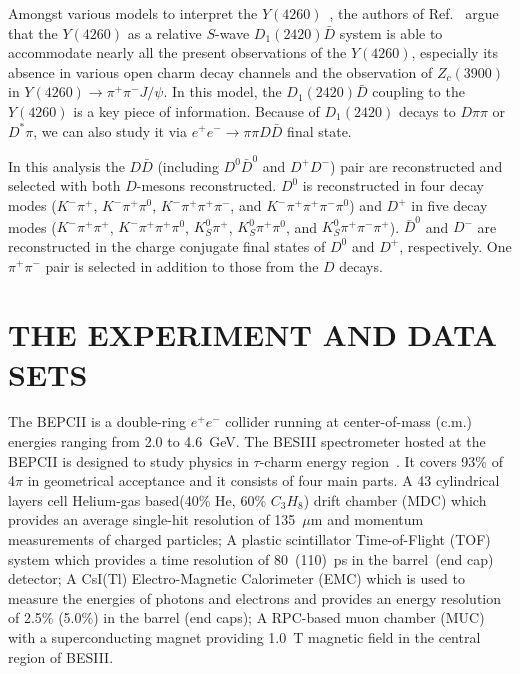 \documentclass[aps,preprint,superscriptaddress,12pt,tightenlines]{revtex4}
\newcommand{\EE}{e^+e^-}
\newcommand{\pp}{\pi^+\pi^-}
\newcommand{\ddn}{D^0\bar{D}^0}
\newcommand{\ddc}{D^+D^-}
\newcommand{\ppjpsi}{\pi^+\pi^- J/\psi}
\begin{document}
Amongst various models to interpret the
$Y(4260)$~\cite{BabarY4260,BELLEY4260}, the authors of
Ref.~\cite{Y4260asDD1} argue that the $Y(4260)$ as a relative
$S$-wave $D_{1}(2420)\bar{D}$ system is able to accommodate nearly all
the present observations of the $Y(4260)$, especially its absence
in various open charm decay channels and the observation of
$Z_{c}(3900)$ in $Y(4260)\to \ppjpsi$. In this model, the
$D_{1}(2420)\bar{D}$ coupling to the $Y(4260)$ is a key piece of
information. Because of $D_{1}(2420)$ decays to $D\pi\pi$ or $D^{*}\pi$,
we can also study it via $\EE\to \pi\pi D\bar{D}$ final state.

In this analysis the $D\bar{D}$ (including $\ddn$ and $\ddc$) pair
are reconstructed and selected with both $D$-mesons reconstructed.
$D^{0}$ is reconstructed in four decay modes ($K^{-}\pi^{+}$,
$K^{-}\pi^{+}\pi^{0}$, $K^{-}\pi^{+}\pi^{+}\pi^{-}$, and
$K^{-}\pi^{+}\pi^{+}\pi^{-}\pi^{0}$) and $D^{+}$ in five decay
modes ($K^{-}\pi^{+}\pi^{+}$, $K^{-}\pi^{+}\pi^{+}\pi^{0}$,
$K^{0}_{S}\pi^{+}$, $K^{0}_{S}\pi^{+}\pi^{0}$, and
$K^{0}_{S}\pi^{+}\pi^{-}\pi^{+}$). $\bar{D}^{0}$ and $D^{-}$ are
reconstructed in the charge conjugate final states of $D^0$ and
$D^+$, respectively. One $\pp$ pair is selected in addition to
those from the $D$ decays.

\section{THE EXPERIMENT AND DATA SETS}

The BEPCII is a double-ring $e^{+}e^{-}$ collider running at
center-of-mass (c.m.) energies ranging from 2.0 to 4.6~GeV. The
BESIII spectrometer hosted at the BEPCII is designed to study
physics in $\tau$-charm energy region~\cite{bepc2,bes3yellow}. It
covers 93\% of 4$\pi$ in geometrical acceptance and it consists of
four main parts. A 43 cylindrical layers cell Helium-gas
based(40\% He, 60\% $C_{3}H_{8}$) drift chamber (MDC) which
provides an average single-hit resolution of 135~$\mu$m and
momentum measurements of charged particles; A plastic scintillator
Time-of-Flight (TOF) system which  provides a time resolution of
80~(110)~ps in the barrel~(end cap) detector; A CsI(Tl)
Electro-Magnetic Calorimeter (EMC) which is used to measure the
energies of photons and electrons and provides an energy
resolution of  2.5\% (5.0\%) in the barrel (end caps); A RPC-based
muon chamber (MUC) with a superconducting magnet providing 1.0~T
magnetic field in the central region of BESIII.
\end{document}
